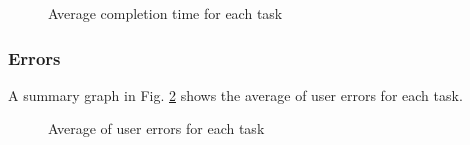     \begin{figure}[!ht]
        \begin{minipage}{\linewidth}
            \centering
            \captionsetup{justification=centering}
            \caption{Average completion time for each task}
            \label{ResultsEfficiencyAvg}
        \end{minipage}
    \end{figure}

\pagebreak

\subsubsection{Errors}
    A summary graph in Fig. \ref{BarsErrors} shows the average of user errors for each task.
    \begin{figure}[!ht]
        \begin{minipage}{\linewidth}
            \centering
            \captionsetup{justification=centering}
            \caption{Average of user errors for each task}
            \label{BarsErrors}
        \end{minipage}
    \end{figure}

